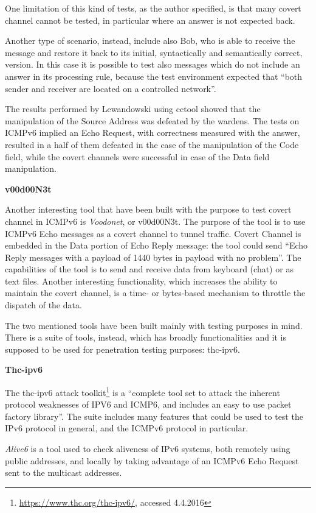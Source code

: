 \documentclass[12pt]{article}
\begin{document}
One limitation of this kind of tests, as the author specified, is that many covert channel cannot be tested, in particular where an answer is not expected back.

Another type of scenario, instead, include also Bob, who is able to receive the message and restore it back to its initial, syntactically and semantically correct, version. In this case it is possible to test also messages which do not include an answer in its processing rule, because the test environment expected that ``both sender and receiver are located on a controlled network''\cite{lewandowski}.

The results performed by Lewandowski using cctool showed that the manipulation of the Source Address was defeated by the wardens. The tests on ICMPv6 implied an Echo Request, with correctness measured with the answer, resulted in a half of them defeated in the case of the manipulation of the Code field, while the covert channels were successful in case of the Data field manipulation.

\textbf{v00d00N3t}

Another interesting tool that have been built with the purpose to test covert channel in ICMPv6 is \textit{Voodonet}, or v00d00N3t. The purpose of the tool is to use ICMPv6 Echo messages as a covert channel to tunnel traffic. Covert Channel is embedded in the Data portion of Echo Reply message: the tool could send ``Echo Reply messages with a  payload of 1440 bytes in payload with no problem''. The capabilities of the tool is to send and receive data from keyboard (chat) or as text files. Another interesting functionality, which increases the ability to maintain the covert channel, is a time- or bytes-based mechanism to throttle the dispatch of the data\cite{voodoo}.

The two mentioned tools have been built mainly with testing purposes in mind. There is a suite of tools, instead, which has broadly functionalities and it is supposed to be used for penetration testing purposes: thc-ipv6.

\textbf{Thc-ipv6}

The thc-ipv6 attack toolkit\footnote{\url{https://www.thc.org/thc-ipv6/}, accessed 4.4.2016} is a ``complete tool set to attack the inherent protocol weaknesses of IPV6 and ICMP6, and includes an easy to use packet factory library''. The suite includes many features that could be used to test the IPv6 protocol in general, and the ICMPv6 protocol in particular\cite{thc}.

\textit{Alive6} is a tool used to check aliveness of IPv6 systems, both remotely using public addresses, and locally by taking advantage of an ICMPv6 Echo Request sent to the multicast addresses\cite{thc}.
\end{document}
